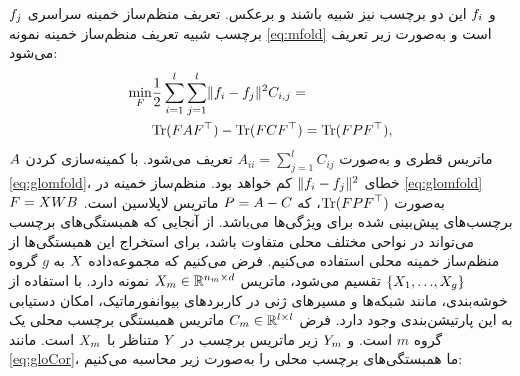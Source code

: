 $\boldmath{f}_j$ و $\boldmath{f}_i$
این دو برچسب نیز شبیه باشند و برعکس. تعریف منظم‌ساز خمینه ‌سراسری برچسب شبیه تعریف منظم‌ساز خمینه نمونه \eqref{eq:mfold} است و به‌صورت زیر تعریف می‌شود:
\begin{align}\label{eq:glomfold}
	\min_{\boldmath{F}}&\frac{1}{2}\sum_{i=1}^l\sum_{j=1}^l\lVert\boldmath{f}_i-\boldmath{f}_j\rVert^2C_{i,j}=\nonumber\\
	&\mathrm{Tr}(\boldmath{FA}\boldmath{F}^\top)-\mathrm{Tr}(\boldmath{FC}\boldmath{F}^\top)=\mathrm{Tr}(\boldmath{FP}\boldmath{F}^\top),\nonumber\\
\end{align}
$\boldmath{A}$ ماتریس قطری و به‌صورت ${A}_{ii}=\sum_{j=1}^l {C}_{ij}$ تعریف می‌شود. 
با کمینه‌سازی کردن \eqref{eq:glomfold}، خطای $\lVert\boldmath{f}_i-\boldmath{f}_j\rVert^2 $ کم خواهد بود. منظم‌ساز خمینه در \eqref{eq:glomfold} به‌صورت $\mathrm{Tr}(\boldmath{FPF}^\top)$، که $\boldmath{P} = \boldmath{A}-\boldmath{C}$ ماتریس لاپلاسین ‌است. $\boldmath{F}=\boldmath{XWB}$ برچسب‌های پیش‌بینی شده برای ویژگی‌ها می‌باشد. از آنجایی که همبستگی‌های برچسب می‌تواند در نواحی مختلف محلی متفاوت باشد، برای استخراج این همبستگی‌ها از منظم‌ساز خمینه محلی استفاده می‌کنیم. فرض می‌کنیم که مجموعه‌داده $\boldmath{X}$ به ${g}$ گروه $\{\boldmath{X}_1,{\dots},\boldmath{X}_g\}$ تقسیم می‌شود، ماتریس $\boldmath{X}_m \in \mathbb{R}^{n_m \times d}$ نمونه دارد. با استفاده از خوشه‌بندی، مانند شبکه‌ها و مسیرهای ژنی \cite{chuang2007network,subramanian2005gene} در کاربردهای بیوانفورماتیک، امکان دستیابی به این پارتیشن‌بندی وجود دارد. فرض  $\boldmath{C}_m \in \mathbb{R}^{{l} \times {l}}$ ماتریس همبستگی برچسب محلی یک گروه ${m}$ است. و $\boldmath{Y}_m$ زیر ماتریس برچسب در $\boldmath{Y}$ متناظر با $\boldmath{X}_m$ است. مانند \eqref{eq:gloCor}، ما همبستگی‌های برچسب محلی را به‌صورت زیر محاسبه می‌کنیم:

